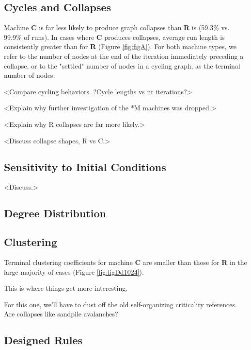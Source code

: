 \documentclass{tufte-handout}
\begin{document}
\subsection{Cycles and Collapses}

Machine \textbf{C} is far less likely to produce graph collapses than
\textbf{R} is (59.3\% vs. 99.9\% of runs). In cases where \textbf{C} produces
collapses, average run length is consistently greater than
for \textbf{R} (Figure \ref{fig:figA}). For both machine types, we refer to
the number of nodes at the end of the iteration immediately preceding a collapse,
or to the "settled" number of nodes in a cycling graph, as the terminal number of nodes.

<Compare cycling behaviors. ?Cycle lengths vs nr iterations?>

<Explain why further investigation of the *M machines was dropped.>

<Explain why R collapses are far more likely.>

<Discuss collapse shapes, R vs C.>

\subsection{Sensitivity to Initial Conditions}

<Discuss.>

\subsection{Degree Distribution}

\subsection{Clustering}

Terminal clustering coefficients for machine \textbf{C} are smaller than those for \textbf{R} in
the large majority of cases (Figure \ref{fig:figDd1024}).

This is where things get more interesting.

For this one, we'll have to dust off the old self-organizing criticality
references. Are collapses like sandpile avalanches?

\subsection{Designed Rules}
\end{document}
